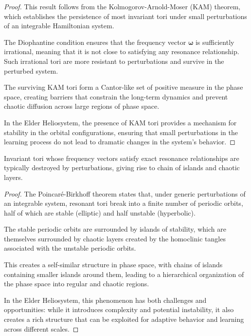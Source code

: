 \begin{proof}
This result follows from the Kolmogorov-Arnold-Moser (KAM) theorem, which establishes the persistence of most invariant tori under small perturbations of an integrable Hamiltonian system.

The Diophantine condition ensures that the frequency vector $\boldsymbol{\omega}$ is sufficiently irrational, meaning that it is not close to satisfying any resonance relationship. Such irrational tori are more resistant to perturbations and survive in the perturbed system.

The surviving KAM tori form a Cantor-like set of positive measure in the phase space, creating barriers that constrain the long-term dynamics and prevent chaotic diffusion across large regions of phase space.

In the Elder Heliosystem, the presence of KAM tori provides a mechanism for stability in the orbital configurations, ensuring that small perturbations in the learning process do not lead to dramatic changes in the system's behavior.
\end{proof}

\begin{theorem}
Invariant tori whose frequency vectors satisfy exact resonance relationships are typically destroyed by perturbations, giving rise to chain of islands and chaotic layers.
\end{theorem}

\begin{proof}
The Poincaré-Birkhoff theorem states that, under generic perturbations of an integrable system, resonant tori break into a finite number of periodic orbits, half of which are stable (elliptic) and half unstable (hyperbolic).

The stable periodic orbits are surrounded by islands of stability, which are themselves surrounded by chaotic layers created by the homoclinic tangles associated with the unstable periodic orbits.

This creates a self-similar structure in phase space, with chains of islands containing smaller islands around them, leading to a hierarchical organization of the phase space into regular and chaotic regions.

In the Elder Heliosystem, this phenomenon has both challenges and opportunities: while it introduces complexity and potential instability, it also creates a rich structure that can be exploited for adaptive behavior and learning across different scales.
\end{proof}

